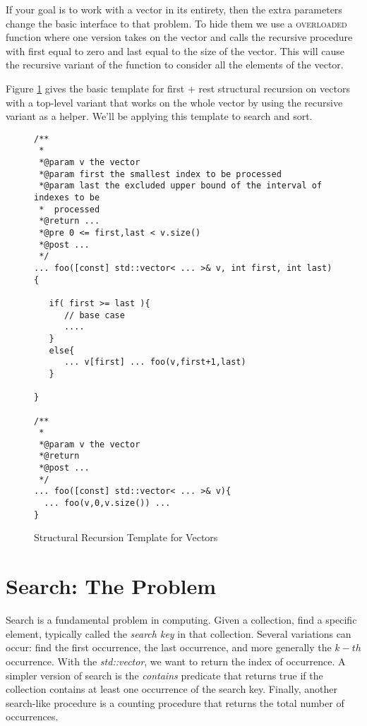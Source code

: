 \documentclass[]{tufte-handout}
\begin{document}
If your goal is to work with a vector in its entirety, then the extra parameters change the basic interface to that problem. To hide them we use a \textsc{overloaded} function where one version takes on the vector and calls the recursive procedure with first equal to zero and last equal to the size of the vector. This will cause the recursive variant of the function to consider all the elements of the vector.

Figure \ref{code:vecrec} gives the basic template for first + rest structural recursion on vectors with a top-level variant that works on the whole vector by using the recursive variant as a helper. We'll be applying this template to search and sort.
\begin{figure}[htpb!]
\begin{lstlisting}
/**
 *
 *@param v the vector
 *@param first the smallest index to be processed
 *@param last the excluded upper bound of the interval of indexes to be
 *  processed
 *@return ...
 *@pre 0 <= first,last < v.size()
 *@post ...
 */
... foo([const] std::vector< ... >& v, int first, int last){

   if( first >= last ){
      // base case
      ....
   }
   else{
      ... v[first] ... foo(v,first+1,last)
   }

}

/**
 *
 *@param v the vector
 *@return
 *@post ...
 */
... foo([const] std::vector< ... >& v){
  ... foo(v,0,v.size()) ...
}

\end{lstlisting}
\caption{Structural Recursion Template for Vectors}
\label{code:vecrec}
\end{figure}


\section{Search: The Problem}

Search is a fundamental problem in computing. Given a collection, find a specific element, typically called the \textit{search key} in that collection. Several variations can occur: find the first occurrence, the last occurrence, and more generally the $k-th$ occurrence.    With the \textit{std::vector}, we want to return the index of occurrence. A simpler version of search is the \textit{contains} predicate that returns true if the collection contains at least one occurrence of the search key. Finally, another search-like procedure is a counting procedure that returns the total number of occurrences.
\end{document}
